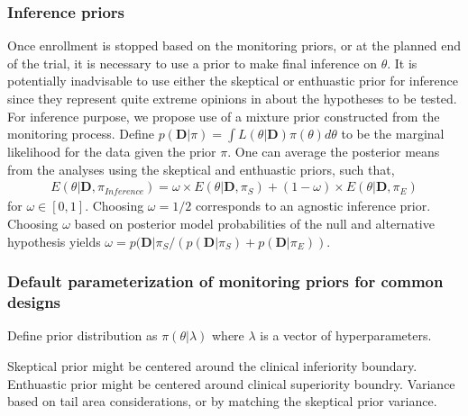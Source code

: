 \documentclass[12pt]{article}
\begin{document}
\subsubsection{Inference priors}
Once enrollment is stopped based on the monitoring priors, or at the planned end of the trial, it is necessary to use a prior to make final inference on $\theta$. It is potentially inadvisable to use either the skeptical or enthuastic prior for inference since they represent quite extreme opinions in about the hypotheses to be tested. For inference purpose, we propose use of a mixture prior constructed from the monitoring process.  Define $p(\mathbf{D}|\pi)=\int L (\theta|\mathbf{D})\pi(\theta)d\theta$ to be the marginal likelihood for the data given the prior $\pi$. One can average the posterior means from the analyses using the skeptical and enthuastic priors, such that,
\begin{align*}
E(\theta|\mathbf{D},\pi_{Inference})=\omega\times E(\theta|\mathbf{D}, \pi_{S})+(1-\omega)\times E(\theta|\mathbf{D}, \pi_{E})
\end{align*}
for $\omega\in[0,1]$. Choosing $\omega=1/2$ corresponds to an agnostic inference prior. Choosing $\omega$ based on posterior model probabilities of the null and alternative hypothesis yields $\omega=p(\mathbf{D}| \pi_{S}/(p(\mathbf{D}| \pi_{S})+p(\mathbf{D}| \pi_{E}))$.
\subsubsection{Default parameterization of monitoring priors for common designs}\label{monitoring_prior_specification}
Define prior distribution as $\pi(\theta|\lambda)$ where $\lambda$ is a vector of hyperparameters.

Skeptical prior might be centered around the clinical inferiority boundary.
Enthuastic prior might be centered around clinical superiority boundry.
Variance based on tail area considerations, or by matching the skeptical prior variance.
\end{document}
